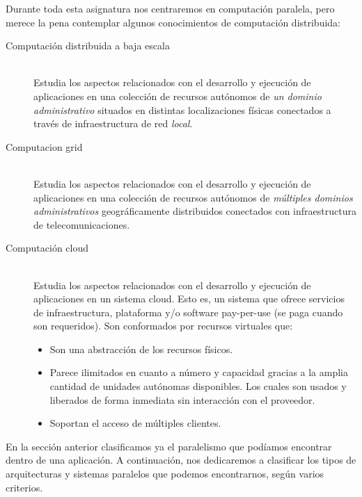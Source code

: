 Durante toda esta asignatura nos centraremos en computación paralela, pero merece la pena contemplar algunos conocimientos de computación distribuida:
\begin{description}
    \item [Computación distribuida a baja escala]~\\
        Estudia los aspectos relacionados con el desarrollo y ejecución de aplicaciones en una colección de recursos autónomos de \emph{un dominio administrativo} situados en distintas localizaciones físicas conectados a través de infraestructura de red \emph{local}.
    \item [Computacion grid]~\\
        Estudia los aspectos relacionados con el desarrollo y ejecución de aplicaciones en una colección de recursos autónomos de \emph{múltiples dominios administrativos} geográficamente distribuidos conectados con infraestructura de telecomunicaciones.
    \item [Computación cloud]~\\
        Estudia los aspectos relacionados con el desarrollo y ejecución de aplicaciones en un sistema cloud. Esto es, un sistema que ofrece servicios de infraestructura, plataforma y/o software pay-per-use (se paga cuando son requeridos). Son conformados por recursos virtuales que:
        \begin{itemize}
            \item Son una abstracción de los recursos físicos.
            \item Parece ilimitados en cuanto a número y capacidad gracias a la amplia cantidad de unidades autónomas disponibles. Los cuales son usados y liberados de forma inmediata sin interacción con el proveedor.
            \item Soportan el acceso de múltiples clientes.
        \end{itemize}
\end{description}

En la sección anterior clasificamos ya el paralelismo que podíamos encontrar dentro de una aplicación. A continuación, nos dedicaremos a clasificar los tipos de arquitecturas y sistemas paralelos que podemos encontrarnos, según varios criterios.

